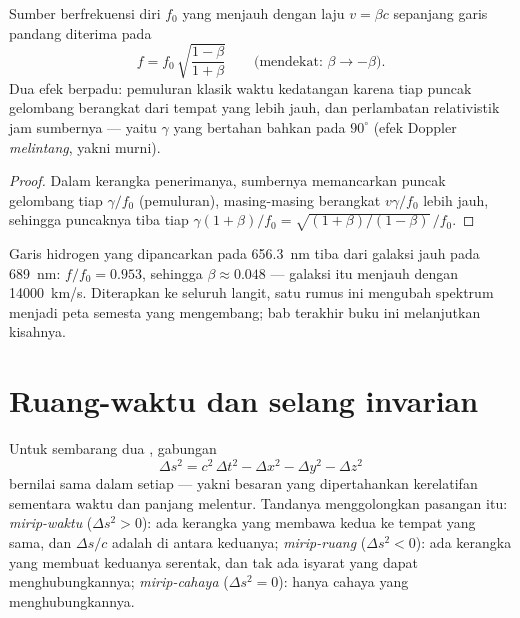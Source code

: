 \begin{proposition}\label{prop:b3:relativistic-kinematics:doppler}
Sumber berfrekuensi diri $f_0$ yang menjauh dengan laju $v = \beta c$
sepanjang garis pandang diterima pada
\[
f = f_0\,\sqrt{\frac{1 - \beta}{1 + \beta}}
\qquad
\text{(mendekat: } \beta \to -\beta\text{)} .
\]
Dua efek berpadu: pemuluran klasik waktu kedatangan karena tiap puncak
gelombang berangkat dari tempat yang lebih jauh, dan perlambatan
relativistik jam sumbernya --- yaitu $\gamma$ yang bertahan bahkan pada
$90^\circ$ (efek Doppler \emph{melintang}, yakni  murni).
\end{proposition}

\begin{proof}
Dalam kerangka penerimanya, sumbernya memancarkan puncak gelombang tiap
$\gamma/f_0$ (pemuluran), masing-masing berangkat $v\gamma/f_0$ lebih
jauh, sehingga puncaknya tiba tiap
$\gamma(1 + \beta)/f_0 = \sqrt{(1+\beta)/
(1-\beta)}\,/f_0$.
\end{proof}

\begin{example}\label{ex:b3:relativistic-kinematics:redshift}
Garis hidrogen yang dipancarkan pada \qty{656.3}{nm} tiba dari galaksi
jauh pada \qty{689}{nm}: $f/f_0 = 0.953$, sehingga $\beta \approx 0.048$ ---
galaksi itu menjauh dengan \qty{14000}{km/s}. Diterapkan ke seluruh
langit, satu rumus ini mengubah spektrum menjadi peta semesta yang
mengembang; bab terakhir buku ini melanjutkan kisahnya.
\end{example}

\section{Ruang-waktu dan selang invarian}

\begin{theorem}\label{thm:b3:relativistic-kinematics:interval}
Untuk sembarang dua , gabungan
\[
\Delta s^2 = c^2\,\Delta t^2 - \Delta x^2 - \Delta y^2 - \Delta z^2
\]
bernilai sama dalam setiap  --- yakni besaran yang
dipertahankan kerelatifan sementara waktu dan panjang melentur.
Tandanya menggolongkan pasangan itu: \emph{mirip-waktu}
($\Delta s^2 > 0$): ada kerangka yang membawa kedua  ke
tempat yang sama, dan $\Delta s/c$ adalah  di antara keduanya;
\emph{mirip-ruang} ($\Delta s^2 < 0$): ada kerangka yang membuat
keduanya serentak, dan tak ada isyarat yang dapat menghubungkannya;
\emph{mirip-cahaya} ($\Delta s^2 = 0$): hanya cahaya yang
menghubungkannya.
\end{theorem}

